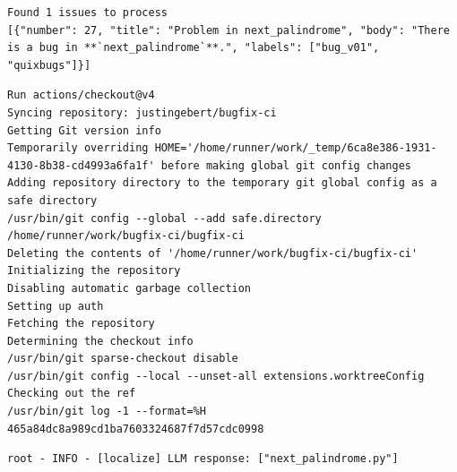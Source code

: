 \vspace{0.5cm}

\begin{lstlisting}[style=log, caption={Filtered issues log excerpt}, label={lst:filtered-issues}, basicstyle=\ttfamily\small, breaklines=true, frame=single, columns=fullflexible]
Found 1 issues to process
[{"number": 27, "title": "Problem in next_palindrome", "body": "There is a bug in **`next_palindrome`**.", "labels": ["bug_v01", "quixbugs"]}]
\end{lstlisting}

\begin{lstlisting}[style=log, caption={Code checkout log excerpt}, label={fig:code-checkout}, basicstyle=\ttfamily\small, breaklines=true, frame=single, columns=fullflexible]
Run actions/checkout@v4
Syncing repository: justingebert/bugfix-ci
Getting Git version info
Temporarily overriding HOME='/home/runner/work/_temp/6ca8e386-1931-4130-8b38-cd4993a6fa1f' before making global git config changes
Adding repository directory to the temporary git global config as a safe directory
/usr/bin/git config --global --add safe.directory /home/runner/work/bugfix-ci/bugfix-ci
Deleting the contents of '/home/runner/work/bugfix-ci/bugfix-ci'
Initializing the repository
Disabling automatic garbage collection
Setting up auth
Fetching the repository
Determining the checkout info
/usr/bin/git sparse-checkout disable
/usr/bin/git config --local --unset-all extensions.worktreeConfig
Checking out the ref
/usr/bin/git log -1 --format=%H
465a84dc8a989cd1ba7603324687f7d57cdc0998
\end{lstlisting}

\begin{lstlisting}[style=log, caption={Bug localization log excerpt}, label={lst:loc}]
root - INFO - [localize] LLM response: ["next_palindrome.py"]
\end{lstlisting}

